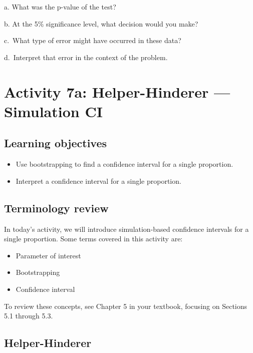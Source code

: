 \documentclass[
]{report}
\newcommand{\rgs}{\vspace{12pt}} %
\newcommand{\rgi}{\hspace{24pt}}  %
\begin{document}
\rgi a. What was the p-value of the test?
\rgs

\rgi b. At the 5\% significance level, what decision would you make?
\rgs

\rgi c.~What type of error might have occurred in these data?
\rgs

\rgi d.~Interpret that error in the context of the problem.
\rgs

\newpage

\hypertarget{activity-7a-helper-hinderer-simulation-ci}{%
\section{Activity 7a: Helper-Hinderer --- Simulation CI}\label{activity-7a-helper-hinderer-simulation-ci}}


\hypertarget{learning-objectives-7}{%
\subsection{Learning objectives}\label{learning-objectives-7}}

\begin{itemize}
\item
  Use bootstrapping to find a confidence interval for a single proportion.
\item
  Interpret a confidence interval for a single proportion.
\end{itemize}

\hypertarget{terminology-review-9}{%
\subsection{Terminology review}\label{terminology-review-9}}

In today's activity, we will introduce simulation-based confidence intervals for a single proportion. Some terms covered in this activity are:

\begin{itemize}
\item
  Parameter of interest
\item
  Bootstrapping
\item
  Confidence interval
\end{itemize}

To review these concepts, see Chapter 5 in your textbook, focusing on Sections 5.1 through 5.3.

\hypertarget{helper-hinderer-2}{%
\subsection{Helper-Hinderer}\label{helper-hinderer-2}}
\end{document}
